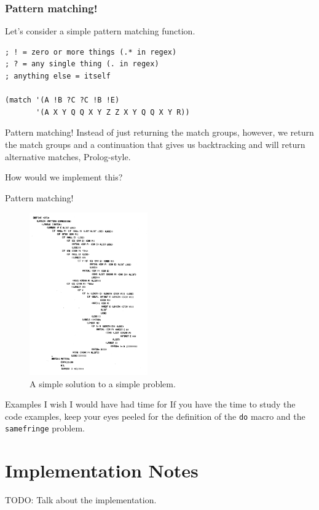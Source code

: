 \documentclass[aspectratio=169]{beamer}
\begin{document}
  \begin{frame}[fragile]
    \frametitle{Pattern matching!}
    Let’s consider a simple pattern matching function.
    \begin{listing}[H]
      \caption{A simple pattern matcher.}
      \begin{verbatim}
; ! = zero or more things (.* in regex)
; ? = any single thing (. in regex)
; anything else = itself

(match '(A !B ?C ?C !B !E)
       '(A X Y Q Q X Y Z Z X Y Q Q X Y R))
      \end{verbatim}
    \end{listing}
  \end{frame}
  \begin{frame}{Pattern matching!}
    Instead of just returning the match groups, however, we return the match
    groups and a continuation that gives us backtracking and will return
    alternative matches, Prolog-style.

    \bigskip

    How would we implement this?
  \end{frame}
  \begin{frame}{Pattern matching!}
    \begin{figure}
      \includegraphics[height=7cm]{match.png}
      \caption{A simple solution to a simple problem.}
    \end{figure}
  \end{frame}
  \begin{frame}{Examples I wish I would have had time for}
    If you have the time to study the code examples, keep your eyes peeled
    for the definition of the \texttt{do} macro and the \texttt{samefringe}
    problem.
  \end{frame}
  \section{Implementation Notes}
  \begin{frame}
    TODO: Talk about the implementation.
  \end{frame}
\end{document}
